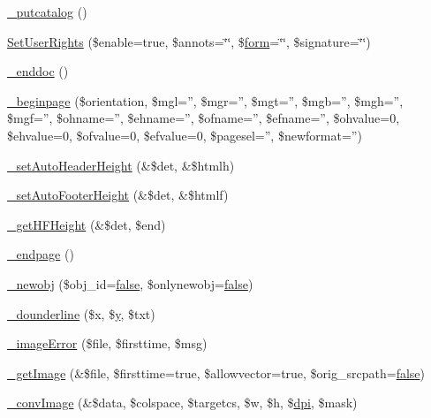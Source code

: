 \begin{DoxyCompactItemize}
\hyperlink{classm_p_d_f_a884800a8a1af816096bc8273db514274}{\-\_\-putcatalog} ()
\item 
\hyperlink{classm_p_d_f_a3a02eeebb5688c9a3b50c3d27705d633}{Set\-User\-Rights} (\$enable=true, \$annots=\char`\"{}\char`\"{}, \$\hyperlink{classform}{form}=\char`\"{}\char`\"{}, \$signature=\char`\"{}\char`\"{})
\item 
\hyperlink{classm_p_d_f_ab1bafb684b977929f6647826da49ab6d}{\-\_\-enddoc} ()
\item 
\hyperlink{classm_p_d_f_a5ef1a898f77e76a60a25df7d48a3a680}{\-\_\-beginpage} (\$orientation, \$mgl='', \$mgr='', \$mgt='', \$mgb='', \$mgh='', \$mgf='', \$ohname='', \$ehname='', \$ofname='', \$efname='', \$ohvalue=0, \$ehvalue=0, \$ofvalue=0, \$efvalue=0, \$pagesel='', \$newformat='')
\item 
\hyperlink{classm_p_d_f_a1dcc229c822af8a7b59b2c52fb972f15}{\-\_\-set\-Auto\-Header\-Height} (\&\$det, \&\$htmlh)
\item 
\hyperlink{classm_p_d_f_a02be9144d4373ca3b84663eebe86169b}{\-\_\-set\-Auto\-Footer\-Height} (\&\$det, \&\$htmlf)
\item 
\hyperlink{classm_p_d_f_a174c8ff46945ef3eef1ab1f3ffaaf456}{\-\_\-get\-H\-F\-Height} (\&\$det, \$end)
\item 
\hyperlink{classm_p_d_f_ab7fd2c48b0caf5a31fa0a0ed867e89fd}{\-\_\-endpage} ()
\item 
\hyperlink{classm_p_d_f_a2bc06ce51daf9d02b56f58ae45483755}{\-\_\-newobj} (\$obj\-\_\-id=\hyperlink{ttfontsuni_8php_afbaa04e5cc97693dc668b3c45d3dd740}{false}, \$onlynewobj=\hyperlink{ttfontsuni_8php_afbaa04e5cc97693dc668b3c45d3dd740}{false})
\item 
\hyperlink{classm_p_d_f_a2bab11e51785f767c65774757308d2e1}{\-\_\-dounderline} (\$x, \$\hyperlink{example43___m_p_d_f_i__booklet_8php_a3f83be162d14f38451e1bc419fbbbcbc}{y}, \$txt)
\item 
\hyperlink{classm_p_d_f_ab7d5e61fe2899c21e738ab25c0a236d6}{\-\_\-image\-Error} (\$file, \$firsttime, \$msg)
\item 
\hyperlink{classm_p_d_f_a96207498f7fc88d4a01c255ffe0152c6}{\-\_\-get\-Image} (\&\$file, \$firsttime=true, \$allowvector=true, \$orig\-\_\-srcpath=\hyperlink{ttfontsuni_8php_afbaa04e5cc97693dc668b3c45d3dd740}{false})
\item 
\hyperlink{classm_p_d_f_ad448178dff7f7b27d408779feeee92ed}{\-\_\-conv\-Image} (\&\$data, \$colspace, \$targetcs, \$w, \$h, \$\hyperlink{config_8php_ab7ce7dd9fef2e7d36bc3da8e0974a06e}{dpi}, \$mask)
\item 

\end{DoxyCompactItemize}
